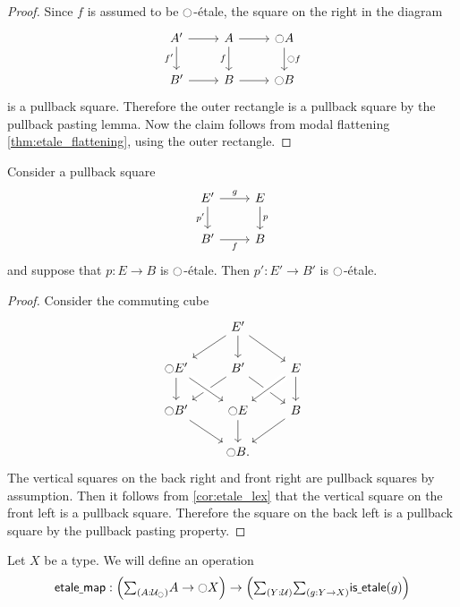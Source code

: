\documentclass[9pt,twosided]{amsart}
\begin{document}
\begin{proof}
Since $f$ is assumed to be ${\ocircle}$-\'etale, the square on the right in the diagram
\begin{equation*}
\begin{tikzcd}
A' \arrow[r] \arrow[d,swap,"{f'}"] & A \arrow[r] \arrow[d,swap,"f"] & \modal A \arrow[d,"\modal f"] \\
B' \arrow[r] & B \arrow[r] & \modal B
\end{tikzcd}
\end{equation*}
is a pullback square. Therefore the outer rectangle is a pullback square by the pullback pasting lemma. Now the claim follows from modal flattening \cref{thm:etale_flattening}, using the outer rectangle.
\end{proof}

\begin{cor}\label{cor:etale_pb}
Consider a pullback square
\begin{equation*}
\begin{tikzcd}
E' \arrow[d,swap,"{p'}"] \arrow[r,"g"] & E \arrow[d,"p"] \\
B' \arrow[r,swap,"f"] & B
\end{tikzcd}
\end{equation*} 
and suppose that $p:E\to B$ is ${\ocircle}$-\'etale. Then $p':E'\to B'$ is ${\ocircle}$-\'etale.
\end{cor}

\begin{proof}
Consider the commuting cube
\begin{equation*}
\begin{tikzcd}
&[-.5ex] E' \arrow[dr] \arrow[d] \arrow[dl] \\
\modal E' \arrow[d] & B' \arrow[dl] \arrow[dr] & E \arrow[dl,crossing over] \arrow[d] \\
\modal B' \arrow[dr] & \modal E \arrow[d] \arrow[from=ul,crossing over] & B \arrow[dl] \\
& \modal B.
\end{tikzcd}
\end{equation*}
The vertical squares on the back right and front right are pullback squares by assumption.
Then it follows from \cref{cor:etale_lex} that the vertical square on the front left is a pullback square.
Therefore the square on the back left is a pullback square by the pullback pasting property.
\end{proof}

\begin{defn}
Let $X$ be a type. We will define an operation
\begin{equation*}
\etmap:\Big(\sm{A:\UU_\modal}A\to\modal X\Big)\to\Big(\sm{Y:\UU}{g:Y\to X}\isetale(g)\Big)
\end{equation*}
\end{defn}
\end{document}

